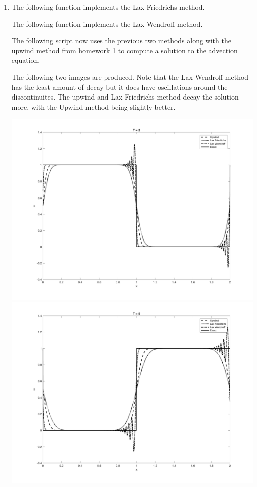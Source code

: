\documentclass[11pt, oneside]{article}
\begin{document}
\begin{enumerate}
  \item %
    The following function implements the Lax-Friedrichs method.
    
    The following function implements the Lax-Wendroff method.
    

    The following script now uses the previous two methods along with the
    upwind method from homework 1 to compute a solution to the advection
    equation.
    
    The following two images are produced.
    Note that the Lax-Wendroff method has the least amount of decay but it does
    have oscillations around the discontinuites.
    The upwind and Lax-Friedrichs method decay the solution more, with the
    Upwind method being slightly better.
    \begin{center}
      \includegraphics[scale=0.5]{Figures/02_01.png}
      \includegraphics[scale=0.5]{Figures/02_02.png}
    \end{center}

\end{enumerate}
\end{document}
